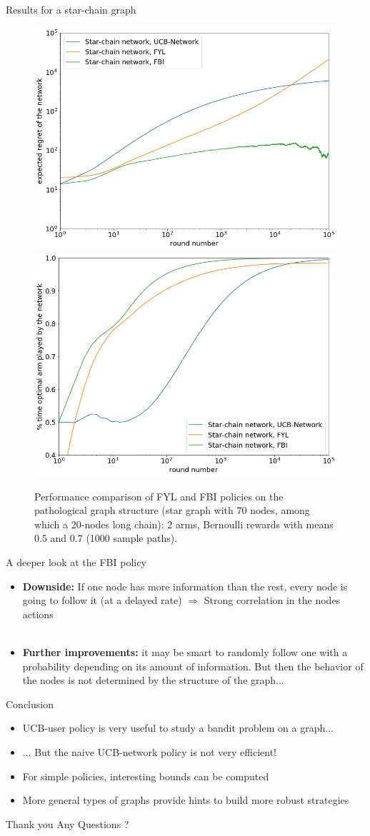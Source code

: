 \documentclass{beamer}
\begin{document}
\begin{frame}{Results for a star-chain graph}
\begin{figure}[H]
  \centering
  \includegraphics[width=0.49\linewidth]{fig5_1.png}
  \includegraphics[width=0.49\linewidth]{fig5_2.png}
  \caption{\centering Performance comparison of FYL and FBI policies on the pathological graph structure (star graph with 70 nodes, among which a 20-nodes long chain): 2 arms, Bernoulli rewards with means $0.5$ and $0.7$ (1000 sample paths).}
\end{figure}
\end{frame}

\begin{frame}{A deeper look at the FBI policy}
\begin{itemize}
\item \textbf{Downside:} If one node has more information than the rest, every node is going to follow it (at a delayed rate) $\Rightarrow$ \alert{Strong correlation in the nodes actions} \\ ~ \\


\item \textbf{Further improvements:} it may be smart to randomly follow one with a \alert{probability depending on its amount of information}. But then the behavior of the nodes is not determined by the structure of the graph...
\end{itemize}
\end{frame}

\begin{frame}{Conclusion}
\begin{itemize}
\item UCB-user policy is very useful to study a bandit problem on a graph...
\item ... But the naive UCB-network policy is not very efficient!
\item For simple policies, interesting bounds can be computed
\item More general types of graphs provide hints to build more robust strategies
\end{itemize}

\end{frame}

\begin{frame}{Thank you}
\centering \Huge Any Questions ?
\end{frame}

\begin{frame}
\AtNextBibliography{\tiny}
\printbibliography
\end{frame}
\end{document}
